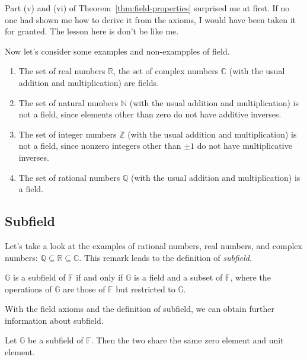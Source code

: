 \begin{note}
	Part (v) and (vi) of Theorem~\ref{thm:field-properties} surprised me at first. If no one had shown me how to derive it from the axioms, I would have been taken it for granted. The lesson here is don't be like me.
\end{note}

Now let's consider some examples and non-exampples of field.

\begin{example}
	\begin{enumerate}[label = (\alph*)]
		\item The set of real numbers $\mathbb{R}$, the set of complex numbers $\mathbb{C}$ (with the usual addition and multiplication) are fields.
		\item The set of natural numbers $\mathbb{N}$ (with the usual addition and multiplication) is not a field, since elements other than zero do not have additive inverses.
		\item The set of integer numbers $\mathbb{Z}$ (with the usual addition and multiplication) is not a field, since nonzero integers other than $\pm 1$ do not have multiplicative inverses.
		\item The set of rational numbers $\mathbb{Q}$ (with the usual addition and multiplication) is a field.
	\end{enumerate}
\end{example}

\subsection{Subfield}

Let's take a look at the examples of rational numbers, real numbers, and complex numbers: $\mathbb{Q}\subseteq\mathbb{R}\subseteq\mathbb{C}$. This remark leads to the definition of \textit{subfield}.

\begin{definition}[Subfield]
	$\mathbb{G}$ is a subfield of $\mathbb{F}$ if and only if $\mathbb{G}$ is a field and a subset of $\mathbb{F}$, where the operations of $\mathbb{G}$ are those of $\mathbb{F}$ but restricted to $\mathbb{G}$.
\end{definition}

With the field axioms and the definition of subfield, we can obtain further information about subfield.

\begin{theorem}
	Let $\mathbb{G}$ be a subfield of $\mathbb{F}$. Then the two share the same zero element and unit element.
\end{theorem}

